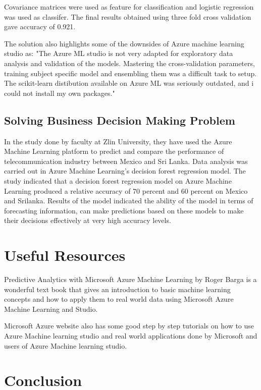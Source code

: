 \documentclass[9pt,twocolumn,twoside]{styles/osajnl}
\begin{document}
Covariance matrices were used as feature for classification and
logistic regression was used as classifer. The final results obtained
using three fold cross validation gave accuracy of 0.921.

The solution also highlights some of the downsides of Azure machine
learning studio as: "The Azure ML studio is not very adapted for
exploratory data analysis and validation of the models. Mastering the
cross-validation parameters, training subject specific model and
ensembling them was a difficult task to setup. The scikit-learn
distibution available on Azure ML was seriously outdated, and i could
not install my own packages."\cite{www-solutionDecodeBrainSignal}

\subsection{Solving Business Decision Making Problem}
In the study done by faculty at Zlin
University\cite{businessDecisionAzureML}, they have used the Azure
Machine Learning platform to predict and compare the performance of
telecommunication industry between Mexico and Sri Lanka. Data analysis
was carried out in Azure Machine Learning's decision forest regression
model. The study indicated that a decision forest regression model on
Azure Machine Learning produced a relative accuracy of 70 percent and
60 percent on Mexico and Srilanka.  Results of the model indicated the
ability of the model in terms of forecasting information, can make
predictions based on these models to make their decisions effectively
at very high accuracy levels.


\section{Useful Resources}

{Predictive Analytics with Microsoft Azure Machine Learning}
\cite{book-azureml} by Roger Barga is a wonderful text book that gives
an introduction to basic machine learning concepts and how to apply
them to real world data using Microsoft Azure Machine Learning and
Studio.

{Microsoft Azure website}\cite{www-azureMLSite} also has some good
step by step tutorials on how to use Azure Machine learning studio and
real world applications done by Microsoft and users of Azure Machine
learning studio.

\section{Conclusion}
\end{document}
